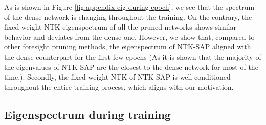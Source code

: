 \documentclass{article} %
\begin{document}
As is shown in Figure \ref{fig:appendix-eig-during-epoch}, we see that the spectrum of the dense network is changing throughout the training. On the contrary, the fixed-weight-NTK eigenspectrum of all the pruned networks shows similar behavior and deviates from the dense one. However, we show that, compared to other foresight pruning methods, the eigenspectrum of  NTK-SAP aligned with the dense counterpart for the first few epochs (As it is shown that the majority of the eigenvalues of NTK-SAP are the closest to the dense network for most of the time.). Secondly, the fixed-weight-NTK of NTK-SAP is well-conditioned throughout the entire training process, which aligns with our motivation.

\subsection{Eigenspectrum during training}
\end{document}
